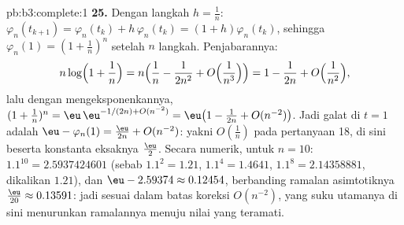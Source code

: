 \begin{solution}{pb:b3:complete:1}
\textbf{25.} Dengan langkah $h = \frac1n$: $\varphi_n(t_{k+1}) =
\varphi_n(t_k) + h\,\varphi_n(t_k) = (1 + h)\varphi_n(t_k)$,
sehingga $\varphi_n(1) = (1 + \frac1n)^n$ setelah $n$ langkah.
Penjabarannya:
\[
n\log\Bigl(1 + \frac1n\Bigr)
= n\Bigl(\frac1n - \frac1{2n^2} + O\Bigl(\frac1{n^3}\Bigr)
\Bigr) = 1 - \frac1{2n} + O\Bigl(\frac1{n^2}\Bigr),
\]
lalu dengan mengeksponenkannya, $(1 + \frac1n)^n = \eu\,\eu^{-1/(2n) +
O(n^{-2})} = \eu\bigl(1 - \frac1{2n} + O(n^{-2})\bigr)$. Jadi
galat di $t = 1$ adalah $\eu - \varphi_n(1) =
\frac{\eu}{2n} + O(n^{-2})$: yakni $O(\frac1n)$ pada pertanyaan 18,
di sini beserta konstanta eksaknya $\frac\eu2$. Secara numerik, untuk $n =
10$: $1.1^{10} = 2.5937424601$ (sebab $1.1^2 = 1.21$, $1.1^4 =
1.4641$, $1.1^8 = 2.14358881$, dikalikan $1.21$), dan $\eu -
2.59374 \approx 0.12454$, berbanding ramalan asimtotiknya
$\frac{\eu}{20} \approx 0.13591$: jadi sesuai dalam batas
koreksi $O(n^{-2})$, yang suku utamanya di sini menurunkan
ramalannya menuju nilai yang teramati.

\end{solution}
